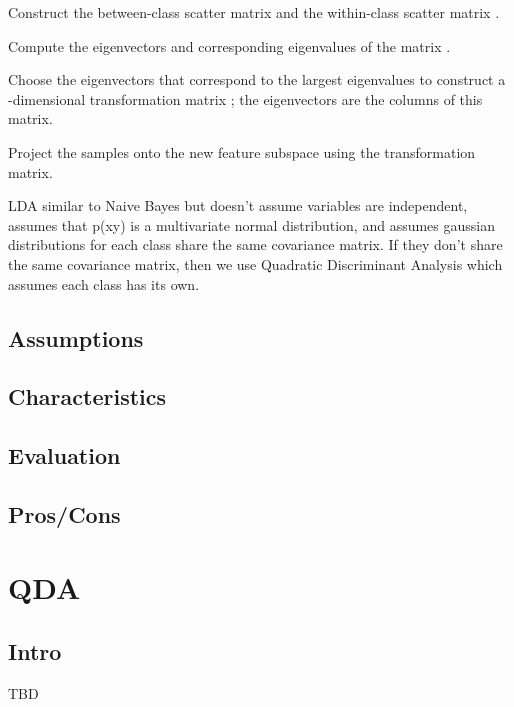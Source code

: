 \documentclass[]{book}
\begin{document}
Construct the between-class scatter matrix and the within-class scatter matrix .

Compute the eigenvectors and corresponding eigenvalues of the matrix .

Choose the eigenvectors that correspond to the largest eigenvalues to construct a -dimensional transformation matrix ; the eigenvectors are the columns of this matrix.

Project the samples onto the new feature subspace using the transformation matrix.

LDA similar to Naive Bayes but doesn't assume variables are independent, assumes that p(x\textbar{}y) is a multivariate normal distribution, and assumes gaussian distributions for each class share the same covariance matrix. If they don't share the same covariance matrix, then we use Quadratic Discriminant Analysis which assumes each class has its own.

\hypertarget{assumptions-11}{%
\subsection{Assumptions}\label{assumptions-11}}

\hypertarget{characteristics-10}{%
\subsection{Characteristics}\label{characteristics-10}}

\hypertarget{evaluation-11}{%
\subsection{Evaluation}\label{evaluation-11}}

\hypertarget{proscons-11}{%
\subsection{Pros/Cons}\label{proscons-11}}

\hypertarget{qda}{%
\section{QDA}\label{qda}}

\hypertarget{intro-12}{%
\subsection{Intro}\label{intro-12}}

TBD
\end{document}
